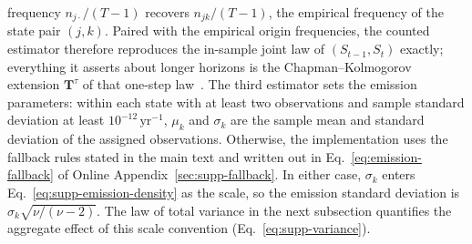frequency $n_{j\cdot}/(T-1)$ recovers $n_{jk}/(T-1)$, the empirical
frequency of the state pair $(j, k)$. Paired with the empirical
origin frequencies, the counted estimator therefore reproduces the
in-sample joint law of $(S_{t-1}, S_t)$ exactly; everything it
asserts about longer horizons is the Chapman--Kolmogorov extension
$\mathbf{T}^\tau$ of that one-step law~\cite{bilmes1998,
grinsteadSnell1997}. The third estimator sets the emission parameters:
within each state with at least two observations and sample standard
deviation at least $10^{-12}\,\mathrm{yr}^{-1}$, $\mu_k$ and
$\sigma_k$ are the sample mean and standard deviation of the assigned
observations. Otherwise, the implementation uses the fallback rules
stated in the main text and written out in
Eq.~\eqref{eq:emission-fallback} of Online
Appendix~\ref{sec:supp-fallback}. In either case, $\sigma_k$ enters
Eq.~\eqref{eq:supp-emission-density} as the scale, so the emission
standard deviation is $\sigma_k \sqrt{\nu/(\nu - 2)}$. The law of
total variance in the next subsection quantifies the aggregate effect
of this scale convention (Eq.~\eqref{eq:supp-variance}).

